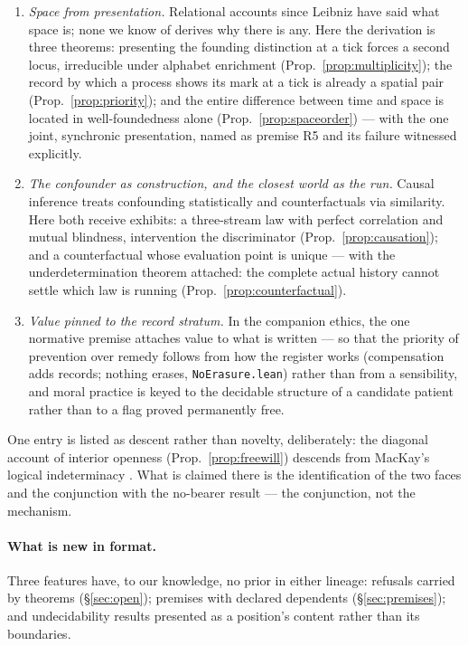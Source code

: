 \documentclass[11pt]{article}
\theoremstyle{remark}
\newcommand{\lf}[1]{\texttt{#1}}       %
\begin{document}
\begin{enumerate}[leftmargin=1.8em, itemsep=3pt]
\item \emph{Space from presentation.} Relational accounts since Leibniz \cite{leibnizclarke} have said what space is; none we know of derives why there is any. Here the derivation is three theorems: presenting the founding distinction at a tick forces a second locus, irreducible under alphabet enrichment (Prop.~\ref{prop:multiplicity}); the record by which a process shows its mark at a tick is already a spatial pair (Prop.~\ref{prop:priority}); and the entire difference between time and space is located in well-foundedness alone (Prop.~\ref{prop:spaceorder}) --- with the one joint, synchronic presentation, named as premise R5 and its failure witnessed explicitly.
\item \emph{The confounder as construction, and the closest world as the run.} Causal inference treats confounding statistically and counterfactuals via similarity. Here both receive exhibits: a three-stream law with perfect correlation and mutual blindness, intervention the discriminator (Prop.~\ref{prop:causation}); and a counterfactual whose evaluation point is unique --- with the underdetermination theorem attached: the complete actual history cannot settle which law is running (Prop.~\ref{prop:counterfactual}).
\item \emph{Value pinned to the record stratum.} In the companion ethics, the one normative premise attaches value to what is written --- so that the priority of prevention over remedy follows from how the register works (compensation adds records; nothing erases, \lf{NoErasure.lean}) rather than from a sensibility, and moral practice is keyed to the decidable structure of a candidate patient rather than to a flag proved permanently free.
\end{enumerate}

One entry is listed as descent rather than novelty, deliberately: the diagonal account of interior openness (Prop.~\ref{prop:freewill}) descends from MacKay's logical indeterminacy \cite{mackay1960}. What is claimed there is the identification of the two faces and the conjunction with the no-bearer result --- the conjunction, not the mechanism.

\paragraph{What is new in format.} Three features have, to our knowledge, no prior in either lineage: refusals carried by theorems (\S\ref{sec:open}); premises with declared dependents (\S\ref{sec:premises}); and undecidability results presented as a position's content rather than its boundaries.
\end{document}
